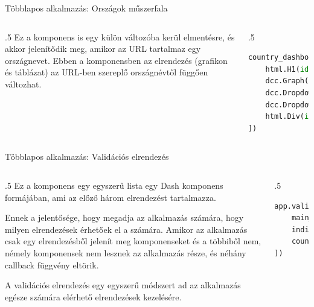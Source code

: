 \documentclass[english, aspectratio=169]{beamer}
\begin{document}
	\begin{frame}[fragile]{Többlapos alkalmazás: Országok műszerfala}
		\begin{columns}
			\begin{column}{.5\textwidth}
				Ez a komponens is egy külön változóba kerül elmentésre, és akkor jelenítődik meg, amikor az URL tartalmaz egy országnevet. Ebben a komponensben az elrendezés (grafikon és táblázat) az URL-ben szereplő országnévtől függően változhat. 
			\end{column}
			\begin{column}{.5\textwidth}
				\begin{lstlisting}[language=python]
country_dashboard = html.Div([
	html.H1(id='country_heading'),
	dcc.Graph(id='country_page_graph'),
	dcc.Dropdown(id='country_page_indicator_dropdown'),
	dcc.Dropdown(id='country_page_contry_dropdown'),
	html.Div(id='country_table')
])
				\end{lstlisting}
			\end{column}
		\end{columns}
	\end{frame}
	
	\begin{frame}[fragile]{Többlapos alkalmazás: Validációs elrendezés}
		\begin{columns}
			\begin{column}{.5\textwidth}
				Ez a komponens egy egyszerű lista egy Dash komponens formájában, ami az előző három elrendezést tartalmazza.\par\smallskip 
				Ennek a jelentősége, hogy megadja az alkalmazás számára, hogy milyen elrendezések érhetőek el a számára. Amikor az alkalmazás csak egy elrendezésből jelenít meg komponenseket és a többiből nem, némely komponensek nem lesznek az alkalmazás része, és néhány callback függvény eltörik.\par\smallskip
				A validációs elrendezés egy egyszerű módszert ad az alkalmazás egésze számára elérhető elrendezések kezelésére. 
			\end{column}
			\begin{column}{.5\textwidth}
				\begin{lstlisting}[language=python]
app.validation_layout = html.Div([
	main_layout,
	indicators_dashboard,
	country_dashboard,
])
				\end{lstlisting}
			\end{column}
		\end{columns}
	\end{frame}
	
\end{document}
